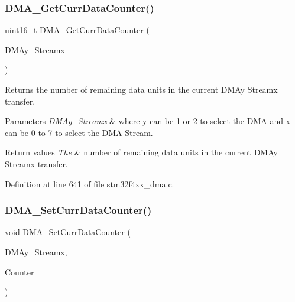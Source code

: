 \subsubsection{\texorpdfstring{D\+M\+A\+\_\+\+Get\+Curr\+Data\+Counter()}{DMA\_GetCurrDataCounter()}}
{\footnotesize\ttfamily uint16\+\_\+t D\+M\+A\+\_\+\+Get\+Curr\+Data\+Counter (\begin{DoxyParamCaption}\item[{\hyperlink{struct_d_m_a___stream___type_def}{D\+M\+A\+\_\+\+Stream\+\_\+\+Type\+Def} $\ast$}]{D\+M\+Ay\+\_\+\+Streamx }\end{DoxyParamCaption})}



Returns the number of remaining data units in the current D\+M\+Ay Streamx transfer. 


\begin{DoxyParams}{Parameters}
{\em D\+M\+Ay\+\_\+\+Streamx} & where y can be 1 or 2 to select the D\+MA and x can be 0 to 7 to select the D\+MA Stream. \\
\hline
\end{DoxyParams}

\begin{DoxyRetVals}{Return values}
{\em The} & number of remaining data units in the current D\+M\+Ay Streamx transfer. \\
\hline
\end{DoxyRetVals}


Definition at line 641 of file stm32f4xx\+\_\+dma.\+c.

\mbox{\label{group___d_m_a___group2_ga6a11a2c951cff59b125ba8857d44e3f3}} 
\subsubsection{\texorpdfstring{D\+M\+A\+\_\+\+Set\+Curr\+Data\+Counter()}{DMA\_SetCurrDataCounter()}}
{\footnotesize\ttfamily void D\+M\+A\+\_\+\+Set\+Curr\+Data\+Counter (\begin{DoxyParamCaption}\item[{\hyperlink{struct_d_m_a___stream___type_def}{D\+M\+A\+\_\+\+Stream\+\_\+\+Type\+Def} $\ast$}]{D\+M\+Ay\+\_\+\+Streamx,  }\item[{uint16\+\_\+t}]{Counter }\end{DoxyParamCaption})}



